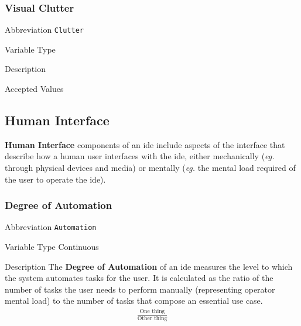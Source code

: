 \subsubsection{Visual Clutter}
\label{subsec:clutter}

\begin{AlignedDesc}
  \item[Abbreviation] \texttt{Clutter}

  \item[Variable Type]

  \item[Description]

  \item[Accepted Values]

  \begin{AlignedDesc}
    \item[\textellipsis]
  \end{AlignedDesc}

\end{AlignedDesc}


\subsection{Human Interface}
\label{sec:humaninterface}

\textbf{Human Interface} components of an \ac{ide} include aspects of the
interface that describe how a human user interfaces with the \ac{ide},
either mechanically (\textit{eg.} through physical devices and media) or
mentally (\textit{eg.} the mental load required of the user to operate the
\ac{ide}).

\subsubsection{Degree of Automation}
\label{subsec:automation}

\begin{AlignedDesc}
  \item[Abbreviation] \texttt{Automation}

  \item[Variable Type] Continuous

  \item[Description] The \textbf{Degree of Automation} of an \ac{ide}
  measures the level to which the system automates tasks for the user. It
  is calculated as the ratio of the number of tasks the user needs to
  perform manually (representing operator mental load) to the number of
  tasks that compose an essential use case.
%
  \begin{align*}
    \frac{\text{One thing}}{\text{Other thing}}
  \end{align*}

\end{AlignedDesc}

